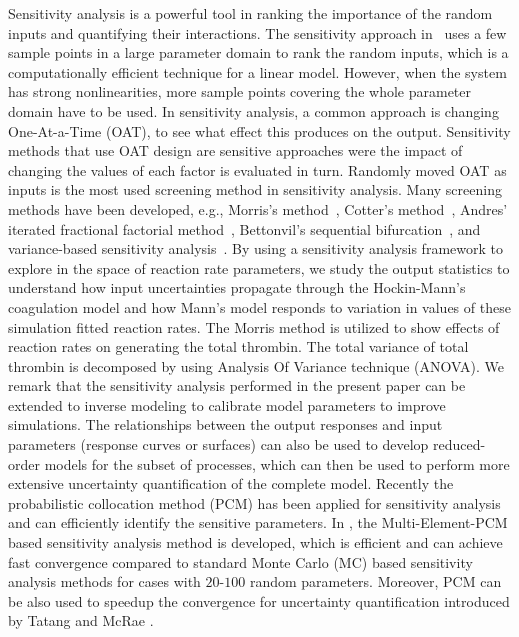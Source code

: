 Sensitivity analysis is a powerful tool in ranking the importance of
the random inputs and quantifying their interactions. The
sensitivity approach in~\cite{Rabitz83} uses a few sample points in
a large parameter domain to rank the random inputs, which is a
computationally efficient technique for a linear model. However,
when the system has strong nonlinearities, more sample points
covering the whole parameter domain have to be used. In sensitivity
analysis, a common approach is changing One-At-a-Time (OAT), to see
what effect this produces on the output. Sensitivity methods that
use OAT design are sensitive approaches were the impact of changing
the values of each factor is evaluated in turn. Randomly moved OAT
as inputs is the most used screening method in sensitivity analysis.
Many screening methods have been developed, e.g., Morris's
method~\cite{Morris91, Campolongo05, Saltelli00}, Cotter's
method~\cite{Cotter79}, Andres' iterated fractional factorial
method~\cite{Andres93}, Bettonvil's sequential
bifurcation~\cite{Bettonvil90}, and variance-based sensitivity
analysis~\cite{Saltelli00}. By using a sensitivity analysis
framework to explore in the space of reaction rate parameters, we
study the output statistics to understand  how input uncertainties
propagate through the Hockin-Mann's coagulation model and how Mann's
model responds to variation in values of these simulation fitted
reaction rates. The Morris method is utilized to show effects of
reaction rates on generating the total thrombin. The total variance
of total thrombin is decomposed by using Analysis Of Variance
technique (ANOVA). We remark that the sensitivity analysis performed
in the present paper can be extended to inverse modeling to
calibrate model parameters to improve simulations. The relationships
between the output responses and input parameters (response curves
or surfaces) can also be used to develop reduced-order models for
the subset of processes, which can then be used to perform more
extensive uncertainty quantification of the complete model. Recently
the probabilistic collocation method (PCM) has been applied for
sensitivity analysis and can efficiently identify the sensitive
parameters\cite{Reagan-2003-combustion,Reagan-2005-JCK}. In
\cite{lin}, the Multi-Element-PCM based sensitivity analysis method
is developed, which is efficient and can achieve fast convergence
compared to standard Monte Carlo (MC) based sensitivity analysis
methods for cases with $20$-$100$ random parameters. Moreover, PCM
can be also used to speedup the convergence for uncertainty
quantification introduced by Tatang and McRae \cite{tatang}.
